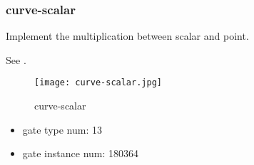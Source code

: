 \subsubsection{curve-scalar}

Implement the multiplication between scalar and point.

See .
\begin{figure}[!ht]
    \centering
    \texttt{[image: curve-scalar.jpg]}
    \caption{curve-scalar}
    \label{fig:curve-scalar}
\end{figure}

\begin{itemize}
    \item gate type num: 13 
    \item gate instance num: 180364          
\end{itemize}
